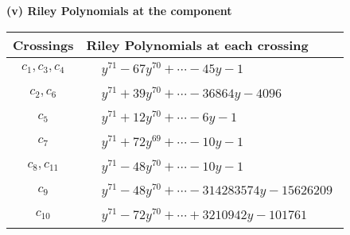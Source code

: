 \documentclass[1p]{elsarticle_modified}
\theoremstyle{definition}
\begin{document}
\flushleft \textbf{(v) Riley Polynomials at the component}\newline \\
\begin{tabular}{m{50pt}|m{274pt}}
Crossings & \hspace{64pt}Riley Polynomials at each crossing \\
\hline $$\begin{aligned}c_{1},c_{3},c_{4}\end{aligned}$$&$\begin{aligned}
&y^{71}-67 y^{70}+\cdots-45 y-1
\end{aligned}$\\
\hline $$\begin{aligned}c_{2},c_{6}\end{aligned}$$&$\begin{aligned}
&y^{71}+39 y^{70}+\cdots-36864 y-4096
\end{aligned}$\\
\hline $$\begin{aligned}c_{5}\end{aligned}$$&$\begin{aligned}
&y^{71}+12 y^{70}+\cdots-6 y-1
\end{aligned}$\\
\hline $$\begin{aligned}c_{7}\end{aligned}$$&$\begin{aligned}
&y^{71}+72 y^{69}+\cdots-10 y-1
\end{aligned}$\\
\hline $$\begin{aligned}c_{8},c_{11}\end{aligned}$$&$\begin{aligned}
&y^{71}-48 y^{70}+\cdots-10 y-1
\end{aligned}$\\
\hline $$\begin{aligned}c_{9}\end{aligned}$$&$\begin{aligned}
&y^{71}-48 y^{70}+\cdots-314283574 y-15626209
\end{aligned}$\\
\hline $$\begin{aligned}c_{10}\end{aligned}$$&$\begin{aligned}
&y^{71}-72 y^{70}+\cdots+3210942 y-101761
\end{aligned}$\\
\hline
\end{tabular}\\~\\
\end{document}
